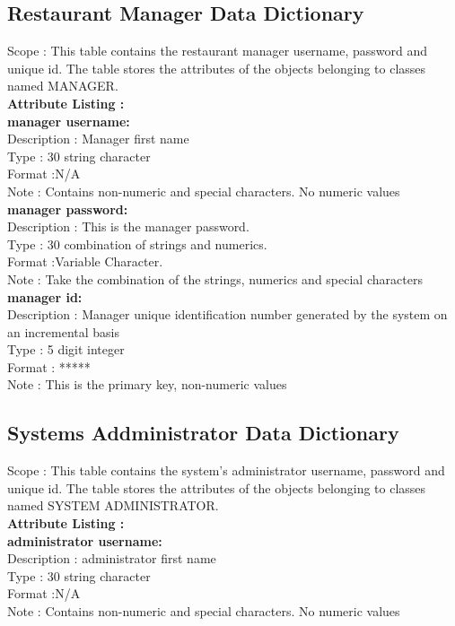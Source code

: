 \documentclass[11pt]{article}
\begin{document}
\subsection{\Large Restaurant Manager Data Dictionary} 
Scope : This table contains the restaurant manager username, password and unique id. The table stores the attributes of the objects belonging to classes named MANAGER.
\\

\textbf{\Large Attribute Listing :}\\

\textbf {manager username:}\\
Description : Manager first name\\
Type : 30 string character \\
Format :N/A \\
Note : Contains non-numeric and special characters. No numeric values\\

\textbf {manager password:}\\
Description : This is the manager password.\\
Type : 30 combination of strings and numerics. \\
Format :Variable Character. \\
Note : Take the combination of the strings, numerics and special characters\\

\textbf {manager id:}\\
Description : Manager unique identification number generated by the system on an incremental basis\\
Type : 5 digit integer \\
Format : ***** \\
Note : This is the primary key, non-numeric values

\subsection{\Large Systems Addministrator Data Dictionary} 
Scope : This table contains the system's administrator username, password and unique id. The table stores the attributes of the objects belonging to classes named SYSTEM ADMINISTRATOR.
\\
\textbf{\Large Attribute Listing :}\\

\textbf {administrator username:}\\
Description : administrator first name\\
Type : 30 string character \\
Format :N/A \\
Note : Contains non-numeric and special characters. No numeric values\\
\end{document}
